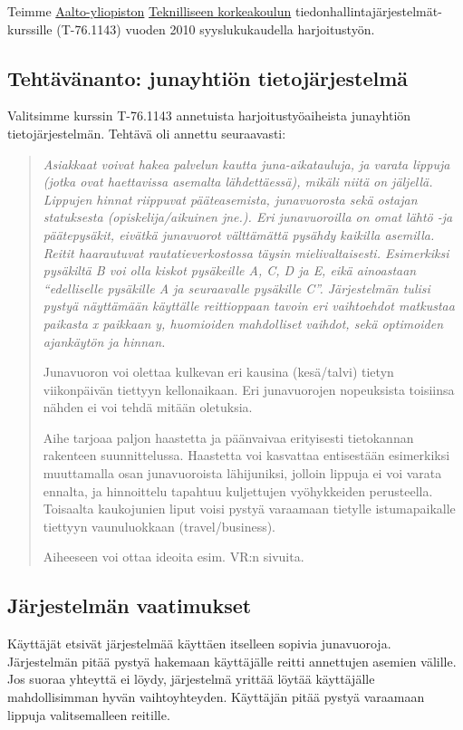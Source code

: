 \documentclass[a4paper,twoside,titlepage,12pt]{article}
\begin{document}
Teimme \href{http://www.aalto.fi/}{Aalto-yliopiston} \href{http://www.tkk.fi/}{Teknilliseen korkeakoulun} tiedonhallintajärjestelmät-kurssille (T-76.1143) vuoden 2010 syyslukukaudella harjoitustyön.



\subsection{Tehtävänanto: junayhtiön tietojärjestelmä}

Valitsimme kurssin T-76.1143 annetuista harjoitustyöaiheista junayhtiön tietojärjestelmän. Tehtävä oli annettu seuraavasti:

\begin{quotation}
\itshape
Asiakkaat voivat hakea palvelun kautta juna-aikatauluja, ja varata lippuja (jotka ovat haettavissa asemalta lähdettäessä), mikäli niitä on jäljellä. Lippujen hinnat riippuvat pääteasemista, junavuorosta sekä ostajan statuksesta (opiskelija/aikuinen jne.). Eri junavuoroilla on omat lähtö -ja päätepysäkit, eivätkä junavuorot välttämättä pysähdy kaikilla asemilla. Reitit haarautuvat rautatieverkostossa täysin mielivaltaisesti. Esimerkiksi pysäkiltä B voi olla kiskot pysäkeille A, C, D ja E, eikä ainoastaan ``edelliselle pysäkille A ja seuraavalle pysäkille C''. Järjestelmän tulisi pystyä näyttämään käyttälle reittioppaan tavoin eri vaihtoehdot matkustaa paikasta x paikkaan y, huomioiden mahdolliset vaihdot, sekä optimoiden ajankäytön ja hinnan.

Junavuoron voi olettaa kulkevan eri kausina (kesä/talvi) tietyn viikonpäivän tiettyyn kellonaikaan. Eri junavuorojen nopeuksista toisiinsa nähden ei voi tehdä mitään oletuksia.

Aihe tarjoaa paljon haastetta ja päänvaivaa erityisesti tietokannan rakenteen suunnittelussa. Haastetta voi kasvattaa entisestään esimerkiksi muuttamalla osan junavuoroista lähijuniksi, jolloin lippuja ei voi varata ennalta, ja hinnoittelu tapahtuu kuljettujen vyöhykkeiden perusteella. Toisaalta kaukojunien liput voisi pystyä varaamaan tietylle istumapaikalle tiettyyn vaunuluokkaan (travel/business).

Aiheeseen voi ottaa ideoita esim. VR:n sivuita.
\end{quotation}

\subsection{Järjestelmän vaatimukset}
Käyttäjät etsivät järjestelmää käyttäen itselleen sopivia junavuoroja.
Järjestelmän pitää pystyä hakemaan käyttäjälle reitti annettujen asemien
välille. Jos suoraa yhteyttä ei löydy, järjestelmä yrittää löytää käyttäjälle
mahdollisimman hyvän vaihtoyhteyden. Käyttäjän pitää pystyä varaamaan lippuja
valitsemalleen reitille.
\end{document}
